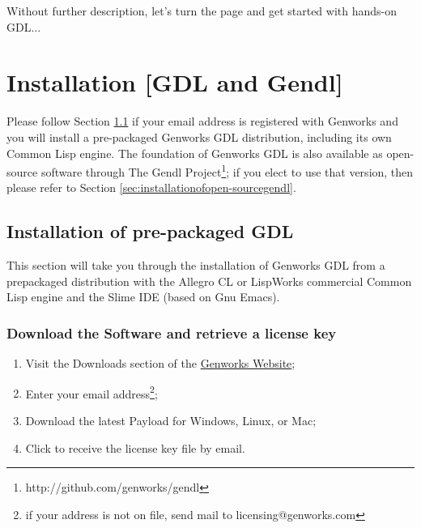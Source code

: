 \documentclass [11pt]{book}
\begin{document}
Without further description, let's turn the page and get
      started with hands-on GDL...

\chapter{Installation [GDL and Gendl]}

\label{chap:installation[gdlandgendl]}

Please follow Section 
\ref{sec:installationofpre-packagedgdl} if your email address is registered with Genworks and you will
install a pre-packaged Genworks GDL distribution, including its own
Common Lisp engine.  The foundation of Genworks GDL is also available
as open-source software through The Gendl Project\footnote{http://github.com/genworks/gendl}; if you elect to use that version, then please refer to Section 
\ref{sec:installationofopen-sourcegendl}.

\section{Installation of pre-packaged GDL}

\label{sec:installationofpre-packagedgdl}

This section will take you through the installation of
Genworks GDL from a prepackaged distribution with the Allegro CL or
LispWorks commercial Common Lisp engine and the Slime IDE (based on
Gnu Emacs).

\subsection{Download the Software and retrieve a license key}

\label{subsec:downloadthesoftwareandretrievealicensekey}



\begin{enumerate}

\item Visit the Downloads section of the \href{http://genworks.com}{Genworks Website};

\item Enter your email address\footnote{if your address is not on file, send mail to licensing@genworks.com};

\item Download the latest Payload for Windows, Linux, or Mac;

\item Click to receive the license key file by email.

\end{enumerate}
\end{document}
